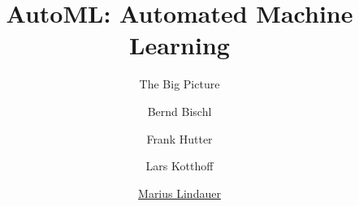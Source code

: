 




\title[AutoML: Big Picture]{AutoML: Automated Machine Learning}
\subtitle{The Big Picture}
\author[Marius Lindauer]{Bernd Bischl \and Frank Hutter \and Lars Kotthoff \and \underline{Marius Lindauer}}
\institute{}
\date{}





	
	\maketitle
	



